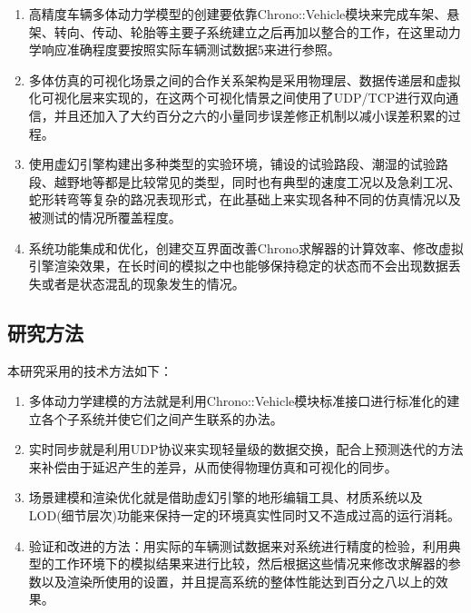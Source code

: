 \begin{enumerate}[label=(\arabic{enumi})]
	\item 高精度车辆多体动力学模型的创建要依靠Chrono::Vehicle模块来完成车架、悬架、转向、传动、轮胎等主要子系统建立之后再加以整合的工作，在这里动力学响应准确程度要按照实际车辆测试数据5来进行参照\cite{song2026fuzzy}。
	\item 多体仿真的可视化场景之间的合作关系架构是采用物理层、数据传递层和虚拟化可视化层来实现的，在这两个可视化情景之间使用了UDP/TCP进行双向通信，并且还加入了大约百分之六的小量同步误差修正机制以减小误差积累的过程\cite{luo2026sar}。
	\item 使用虚幻引擎构建出多种类型的实验环境，铺设的试验路段、潮湿的试验路段、越野地等都是比较常见的类型，同时也有典型的速度工况以及急刹工况、蛇形转弯等复杂的路况表现形式，在此基础上来实现各种不同的仿真情况以及被测试的情况所覆盖程度\cite{gao2025pitch}。
	\item 系统功能集成和优化，创建交互界面改善Chrono求解器的计算效率、修改虚拟引擎渲染效果，在长时间的模拟之中也能够保持稳定的状态而不会出现数据丢失或者是状态混乱的现象发生的情况。
\end{enumerate}

\subsection{研究方法}
本研究采用的技术方法如下：
\begin{enumerate}[label=(\arabic{enumi})]
	\item 多体动力学建模的方法就是利用Chrono::Vehicle模块标准接口进行标准化的建立各个子系统并使它们之间产生联系的办法。
	\item 实时同步就是利用UDP协议来实现轻量级的数据交换，配合上预测迭代的方法来补偿由于延迟产生的差异，从而使得物理仿真和可视化的同步。
	\item 场景建模和渲染优化就是借助虚幻引擎的地形编辑工具、材质系统以及LOD(细节层次)功能来保持一定的环境真实性同时又不造成过高的运行消耗。
	\item 验证和改进的方法：用实际的车辆测试数据来对系统进行精度的检验，利用典型的工作环境下的模拟结果来进行比较，然后根据这些情况来修改求解器的参数以及渲染所使用的设置，并且提高系统的整体性能达到百分之八以上的效果\cite{wang2025longitudinal}。
\end{enumerate}

